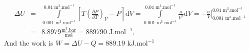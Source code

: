 \documentclass[calculator,allquestions,datasheet,mock]{exam_newMarcus2}
\newcommand{\frc}{\displaystyle\frac}
\renewcommand{\d}[1]{\mathrm{d} #1 }
\begin{document}
\begin{question}
\begin{enumerate}[(a)]
{       \begin{eqnarray}
         \Delta U &=& \int\limits_{0.001\text{ m}^{3}.\text{mol}^{-1}}^{0.04\text{ m}^{3}.\text{mol}^{-1}}\left[T\left(\frc{\partial P}{\partial T}\right)_{V}-P\right]\d V = \int\limits_{0.001\text{ m}^{3}.\text{mol}^{-1}}^{0.04\text{ m}^{3}.\text{mol}^{-1}} \frc{a}{V^{2}} \d V = -\left.\frc{a}{V}\right|_{0.001\text{ m}^{3}.\text{mol}^{-1}}^{0.04\text{ m}^{3}.\text{mol}^{-1}} \nonumber \\
                  &=& 8.8979\frc{\text{m}^{3}.\text{bar}}{\text{mol}} = 889790\text{ J.mol}^{-1}, \nonumber
       \end{eqnarray}
       And the work is $W= \Delta U - Q = 889.19\text{ kJ.mol}^{-1}$~

}
%
\end{enumerate} 
%
\end{question}

\clearpage
\end{document}
